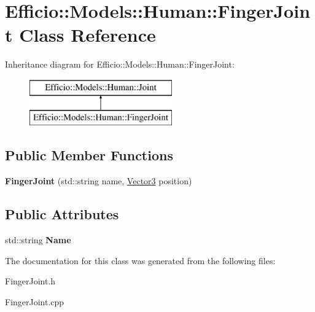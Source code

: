 \hypertarget{class_efficio_1_1_models_1_1_human_1_1_finger_joint}{}\section{Efficio\+:\+:Models\+:\+:Human\+:\+:Finger\+Joint Class Reference}
\label{class_efficio_1_1_models_1_1_human_1_1_finger_joint}
Inheritance diagram for Efficio\+:\+:Models\+:\+:Human\+:\+:Finger\+Joint\+:\begin{figure}[H]
\begin{center}
\leavevmode
\includegraphics[height=2.000000cm]{class_efficio_1_1_models_1_1_human_1_1_finger_joint}
\end{center}
\end{figure}
\subsection*{Public Member Functions}
\begin{DoxyCompactItemize}
\item 
{\bfseries Finger\+Joint} (std\+::string name, \hyperlink{class_efficio_1_1_vector3}{Vector3} position)\hypertarget{class_efficio_1_1_models_1_1_human_1_1_finger_joint_a07254ca40adb8308c1da6d2c9acb1f1e}{}\label{class_efficio_1_1_models_1_1_human_1_1_finger_joint_a07254ca40adb8308c1da6d2c9acb1f1e}

\end{DoxyCompactItemize}
\subsection*{Public Attributes}
\begin{DoxyCompactItemize}
\item 
std\+::string {\bfseries Name}\hypertarget{class_efficio_1_1_models_1_1_human_1_1_finger_joint_a1b94021021488a42b16518f0ecaf8941}{}\label{class_efficio_1_1_models_1_1_human_1_1_finger_joint_a1b94021021488a42b16518f0ecaf8941}

\end{DoxyCompactItemize}


The documentation for this class was generated from the following files\+:\begin{DoxyCompactItemize}
\item 
Finger\+Joint.\+h\item 
Finger\+Joint.\+cpp\end{DoxyCompactItemize}

